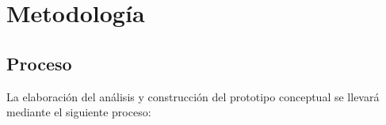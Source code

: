 \documentclass[10pt]{book}
\begin{document}
%
%
%
%

	
	
\chapter{Metodología}


\section{Proceso}

	La elaboración del análisis y construcción del prototipo conceptual se llevará mediante el siguiente proceso:
	
\end{document}
